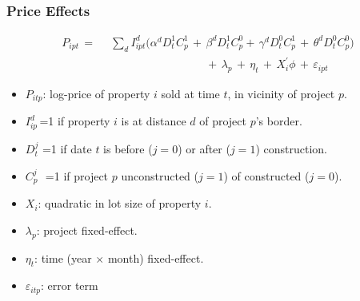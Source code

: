 \documentclass[aspectratio=32]{beamer}
\begin{document}
\begin{frame}
\frametitle{Price Effects}
\begin{equation*}
\begin{split}
P_{ipt} \, = & \,\,\,  \sum\limits_{d} I^d_{ipt}\Big( \alpha^d D^1_tC^1_p \, + \, \beta^dD^1_tC^0_p + \, \gamma^dD^0_tC^1_p \, + \, \theta^dD^0_tC^0_p \Big ) \\ 
&\quad\quad\quad\quad\quad\quad\quad\quad\quad + \, \lambda_p \,  + \, \eta_{t} \, +\,  X^{'}_{i}\phi \, + \, \varepsilon_{ipt}
\end{split}
\end{equation*}

\begin{itemize}
\item $P_{itp}$: log-price of property $i$ sold at time $t$, in vicinity of project $p$.
\item $I^d_{ip}$\,=1 if property $i$ is at distance $d$ of project $p$'s border.
\item $D^j_{t}$ =1 if date $t$ is before ($j=0$) or after ($j=1$) construction. 
\item $C^j_{p}\,\,$ =1 if project $p$ unconstructed ($j=1$) of constructed ($j=0$).
\item $X_{i}$: quadratic in lot size of property $i$.
\item $\lambda_p$: project fixed-effect.
\item $\eta_{t}$: time (year$\,\times\,$month) fixed-effect.

\item $\varepsilon_{itp}$: error term
\end{itemize}
\end{frame}

\end{document}
